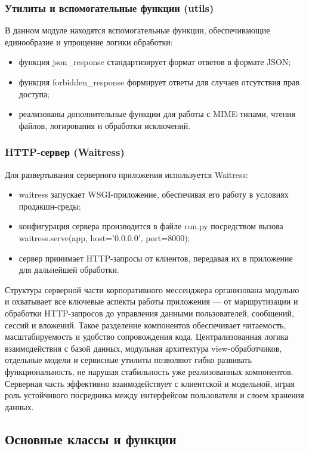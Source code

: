 \subsubsection{Утилиты и вспомогательные функции (utils)}
В данном модуле находятся вспомогательные функции, обеспечивающие единообразие и упрощение логики обработки:
\begin{itemize}
	\item функция json\_response стандартизирует формат ответов в формате JSON;
	\item функция forbidden\_response формирует ответы для случаев отсутствия прав доступа;
	\item реализованы дополнительные функции для работы с MIME-типами, чтения файлов, логирования и обработки исключений.
\end{itemize}

\subsubsection{HTTP-сервер (Waitress)}
Для развертывания серверного приложения используется Waitress:
\begin{itemize}
	\item waitress запускает WSGI-приложение, обеспечивая его работу в условиях продакшн-среды;
	\item конфигурация сервера производится в файле run.py посредством вызова waitress.serve(app, host='0.0.0.0', port=8000);
	\item сервер принимает HTTP-запросы от клиентов, передавая их в приложение для дальнейшей обработки.
\end{itemize}

Структура серверной части корпоративного мессенджера организована модульно и охватывает все ключевые аспекты работы приложения — от маршрутизации и обработки HTTP-запросов до управления данными пользователей, сообщений, сессий и вложений. Такое разделение компонентов обеспечивает читаемость, масштабируемость и удобство сопровождения кода. Централизованная логика взаимодействия с базой данных, модульная архитектура view-обработчиков, отдельные модели и сервисные утилиты позволяют гибко развивать функциональность, не нарушая стабильность уже реализованных компонентов. Серверная часть эффективно взаимодействует с клиентской и модельной, играя роль устойчивого посредника между интерфейсом пользователя и слоем хранения данных.

\subsection{Основные классы и функции}

